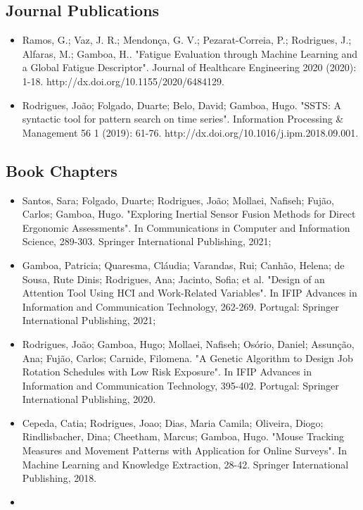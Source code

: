\subsection{Journal Publications}

\begin{itemize}
\item Ramos, G.; Vaz, J. R.; Mendonça, G. V.; Pezarat-Correia, P.; Rodrigues, J.; Alfaras, M.; Gamboa, H.. "Fatigue Evaluation through Machine Learning and a Global Fatigue Descriptor". Journal of Healthcare Engineering 2020 (2020): 1-18. http://dx.doi.org/10.1155/2020/6484129.

\item Rodrigues, João; Folgado, Duarte; Belo, David; Gamboa, Hugo. "SSTS: A syntactic tool for pattern search on time series". Information Processing & Management 56 1 (2019): 61-76. http://dx.doi.org/10.1016/j.ipm.2018.09.001.
\end{itemize}

\subsection{Book Chapters}

\begin{itemize}

\item Santos, Sara; Folgado, Duarte; Rodrigues, João; Mollaei, Nafiseh; Fujão, Carlos; Gamboa, Hugo. "Exploring Inertial Sensor Fusion Methods for Direct Ergonomic Assessments". In Communications in Computer and Information Science, 289-303. Springer International Publishing, 2021;

\item Gamboa, Patricia; Quaresma, Cláudia; Varandas, Rui; Canhão, Helena; de Sousa, Rute Dinis; Rodrigues, Ana; Jacinto, Sofia; et al. "Design of an Attention Tool Using HCI and Work-Related Variables". In IFIP Advances in Information and Communication Technology, 262-269. Portugal: Springer International Publishing, 2021;

\item Rodrigues, João; Gamboa, Hugo; Mollaei, Nafiseh; Osório, Daniel; Assunção, Ana; Fujão, Carlos; Carnide, Filomena. "A Genetic Algorithm to Design Job Rotation Schedules with Low Risk Exposure". In IFIP Advances in Information and Communication Technology, 395-402. Portugal: Springer International Publishing, 2020.

\item Cepeda, Catia; Rodrigues, Joao; Dias, Maria Camila; Oliveira, Diogo; Rindlisbacher, Dina; Cheetham, Marcus; Gamboa, Hugo. "Mouse Tracking Measures and Movement Patterns with Application for Online Surveys". In Machine Learning and Knowledge Extraction, 28-42. Springer International Publishing, 2018.

\item 

\end{itemize}


